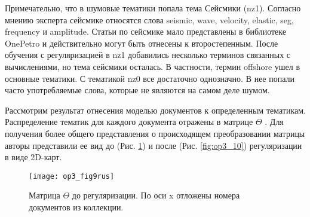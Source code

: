 \begin{table}[H]
\centering
\caption{Top10 терминов, образующих шумовые тематики до и послеприменения обучения с регуляризацией.}
\label{tab:op3_3}
\end{table}

Примечательно, что в шумовые тематики попала тема Сейсмики (nz1).
Согласно мнению эксперта сейсмике относятся слова seismic, wave,
velocity, elastic, seg, frequency и amplitude. Статьи по сейсмике мало
представлены в библиотеке OnePetro и действительно могут быть отнесены к
второстепенным. После обучения с регуляризацией в nz1 добавились
несколько терминов связанных с вычислениями, но тема сейсмики осталась.
В частности, термин offshore ушел в основные тематики. С тематикой nz0
все достаточно однозначно. В нее попали часто употребляемые слова,
которые не являются на самом деле шумом.

Рассмотрим результат отнесения моделью документов к определенным
тематикам. Распределение тематик для каждого документа отражены в матрице
$\Theta$ . Для получения более общего представления о происходящем преобразовании
матрицы авторы представили ее вид до (Рис. \ref{fig:op3_9}) и после (Рис. \ref{fig:op3_10}) регуляризации в
виде 2D-карт.

\begin{figure}[H]
  \caption{Матрица  $ \Theta $ до регуляризации. По оси x отложены номера документов из коллекции.}
  \centering
    \texttt{[image: op3\_fig9rus]}
  \label{fig:op3_9}
\end{figure}

